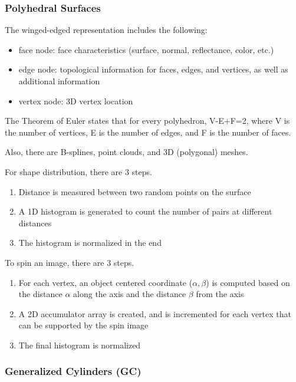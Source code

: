 \documentclass{article}
\begin{document}
\begin{multicols}{2}
\subsubsection{Polyhedral Surfaces}

The winged-edged representation includes the following:

\begin{itemize}
  \item {face node: face characteristics (surface, normal, reflectance, color, etc.)}
  \item {edge node: topological information for faces, edges, and vertices, as well as additional information}
  \item {vertex node: 3D vertex location}
\end{itemize}

The Theorem of Euler states that for every polyhedron, V-E+F=2, where V is the number of vertices, E is the number of edges, and F is the number of faces.

Also, there are B-splines, point clouds, and 3D (polygonal) meshes.

\vspace{2mm}

For shape distribution, there are 3 steps.
\begin{enumerate}
  \item {Distance is measured between two random points on the surface}
  \item {A 1D histogram is generated to count the number of pairs at different distances}
  \item {The histogram is normalized in the end}
\end{enumerate}

To spin an image, there are 3 steps.
\begin{enumerate}
  \item {For each vertex, an object centered coordinate ($\alpha, \beta$) is computed based on the distance $\alpha$ along the axis and the distance $\beta$ from the axis}
  \item {A 2D accumulator array is created, and is incremented for each vertex that can be supported by the spin image}
  \item {The final histogram is normalized}
\end{enumerate}

\subsubsection{Generalized Cylinders (GC)}


\end{multicols}
\end{document}
